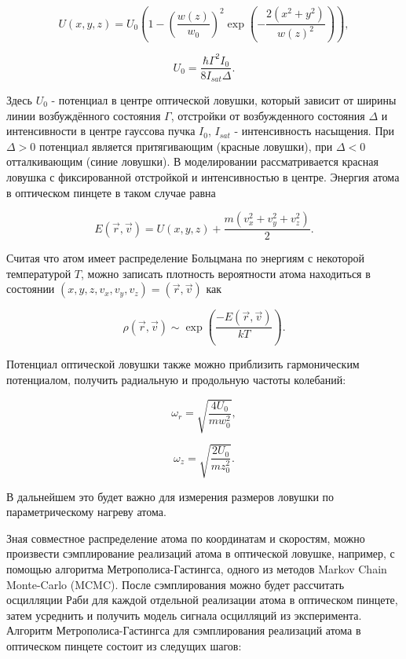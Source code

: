 \begin{equation}
	U\left(x,y,z\right)=U_0\left(1-\left(\frac{w\left(z\right)}{w_0}\right)^2\exp{\left(-\frac{2\left(x^2+y^2\right)}{w\left(z\right)^2}\right)}\right),	
\end{equation}

\begin{equation}
	U_0 = \frac{\hbar \Gamma^2 I_0}{8 I_{sat}\Delta}.
\end{equation}

Здесь $U_0$ - потенциал в центре оптической ловушки, который зависит от ширины линии возбуждённого состояния $\Gamma$, отстройки от возбужденного состояния $\Delta$ и интенсивности в центре гауссова пучка $I_0$, $I_{sat}$ - интенсивность насыщения. При $\Delta > 0$ потенциал является притягивающим (красные ловушки), при $\Delta < 0$ отталкивающим (синие ловушки). В моделировании рассматривается красная ловушка с фиксированной отстройкой и интенсивностью в центре. Энергия атома в оптическом пинцете в таком случае равна 

\begin{equation}
	E\left(\vec{r},\vec{v}\right)=U\left(x,y,z\right)+\frac{m\left(v_x^2+v_y^2+v_z^2\right)}{2}.
\end{equation}	 

Считая что атом имеет распределение Больцмана по энергиям с некоторой температурой $T$, можно записать плотность вероятности атома находиться в состоянии $(x,y,z,v_x,v_y,v_z) = (\vec{r},\vec{v})$ как 

\begin{equation}
	\rho\left(\vec{r},\vec{v}\right)\sim \exp{\left(\frac{-E\left(\vec{r},\vec{v}\right)}{kT}\right)}.
\end{equation}

Потенциал оптической ловушки также можно приблизить гармоническим потенциалом, получить радиальную и продольную частоты колебаний:

\begin{equation}
	\omega_r=\sqrt{\frac{4U_0}{mw_0^2}},
\end{equation}

\begin{equation}
	\omega_z=\sqrt{\frac{2U_0}{mz_0^2}}.
\end{equation}

В дальнейшем это будет важно для измерения размеров ловушки по параметрическому нагреву атома.
 	   	 
Зная совместное распределение атома по координатам и скоростям, можно произвести сэмплирование реализаций атома в оптической ловушке, например, с помощью алгоритма Метрополиса-Гастингса, одного из методов Markov Chain Monte-Carlo (MCMC). После сэмплирования можно будет рассчитать осцилляции Раби для каждой отдельной реализации атома в оптическом пинцете, затем усреднить и получить модель сигнала осцилляций из эксперимента. Алгоритм Метрополиса-Гастингса для сэмплирования реализаций атома в оптическом пинцете состоит из следущих шагов:

